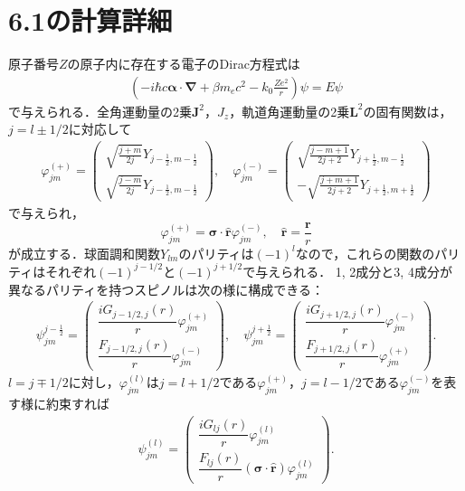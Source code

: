 \section*{6.1の計算詳細}
原子番号$Z$の原子内に存在する電子のDirac方程式は
\begin{align}
  \left( - i\hbar c\boldsymbol{\alpha}\cdot\boldsymbol{\nabla} + \beta m_ec^2 - k_0\frac{Ze^2}{r}\right)\psi=E\psi
  \label{Dirac_eq}
\end{align}
で与えられる．全角運動量の2乗$\boldsymbol{J}^2$，$J_z$，軌道角運動量の2乗$\boldsymbol{L}^2$の固有関数は，$j=l\pm 1/2$に対応して
\begin{align}
  \varphi_{jm}^{( + )} =
  \begin{pmatrix}
    \sqrt{\frac{j + m}{2j}}Y_{j - \frac{1}{2},m - \frac{1}{2}}\\
    \sqrt{\frac{j - m}{2j}}Y_{j - \frac{1}{2},m - \frac{1}{2}}
  \end{pmatrix}
  ,\quad\varphi_{jm}^{( - )} =
  \begin{pmatrix}
    \sqrt{\frac{j - m + 1}{2j + 2}}Y_{j + \frac{1}{2},m - \frac{1}{2}}\\
     - \sqrt{\frac{j + m + 1}{2j + 2}}Y_{j + \frac{1}{2},m + \frac{1}{2}}
  \end{pmatrix}
  \label{eigenfunc}
\end{align}
で与えられ，
\[\varphi_{jm}^{( + )} = \boldsymbol{\sigma}\cdot\hat{\boldsymbol{r}}\varphi_{jm}^{( - )}, \quad\hat{\boldsymbol{r}} = \frac{\boldsymbol{r}}{r}\]
が成立する．球面調和関数$Y_{lm}$のパリティは$( - 1)^l$なので，これらの関数のパリティはそれぞれ$( - 1)^{j - 1/2}$と$( - 1)^{j + 1/2}$で与えられる．
1, 2成分と3, 4成分が異なるパリティを持つスピノルは次の様に構成できる：
\begin{align}
  \psi_{jm}^{j - \frac{1}{2}}=
  \begin{pmatrix}
    \dfrac{iG_{j - 1/2,j}(r)}{r}\varphi_{jm}^{( + )} \\
    \dfrac{F_{j - 1/2,j}(r)}{r}\varphi_{jm}^{( - )}
  \end{pmatrix}
  ,\quad\psi_{jm}^{j + \frac{1}{2}}=
  \begin{pmatrix}
    \dfrac{iG_{j + 1/2,j}(r)}{r}\varphi_{jm}^{( - )} \\
    \dfrac{F_{j + 1/2,j}(r)}{r}\varphi_{jm}^{( + )}
  \end{pmatrix}
  .
\end{align}
$l=j\mp1/2$に対し，$\varphi_{jm}^{(l)}$は$j=l + 1/2$である$\varphi_{jm}^{( + )}$，$j=l - 1/2$である$\varphi_{jm}^{( - )}$を表す様に約束すれば
\begin{align}
  \psi_{jm}^{(l)}=
  \begin{pmatrix}
    \dfrac{iG_{lj}(r)}{r}\varphi_{jm}^{(l)} \\
    \dfrac{F_{lj}(r)}{r}(\boldsymbol{\sigma}\cdot\hat{\boldsymbol{r}})\varphi_{jm}^{(l)}
  \end{pmatrix}
  .\label{spinor_parity_l}
\end{align}
